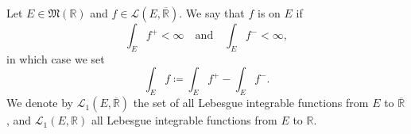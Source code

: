 \documentclass[notoc,notitlepage]{tufte-book}
\begin{document}
\begin{defn}\label{defn:lebesgue_integrable}
  Let $E \in \mathfrak{M}(\mathbb{R})$  and $f \in \mathcal{L}(E,
  \overline{\mathbb{R}})$. We say that $f$ is  on
  $E$ if 
  \begin{equation*}
    \int_{E} f^+ < \infty \quad \text{and} \quad \int_{E} f^- < \infty,
  \end{equation*}
  in which case we set
  \begin{equation*}
    \int_{E} f \coloneqq \int_{E} f^+ - \int_{E} f^-.
  \end{equation*}
  We denote by $\mathcal{L}_1(E, \overline{\mathbb{R}})$ the set of all Lebesgue
  integrable functions from $E$ to $\overline{\mathbb{R}}$, and
  $\mathcal{L}_1(E, \mathbb{R})$ all Lebesgue integrable functions from $E$ to
  $\mathbb{R}$.
\end{defn}
\end{document}
